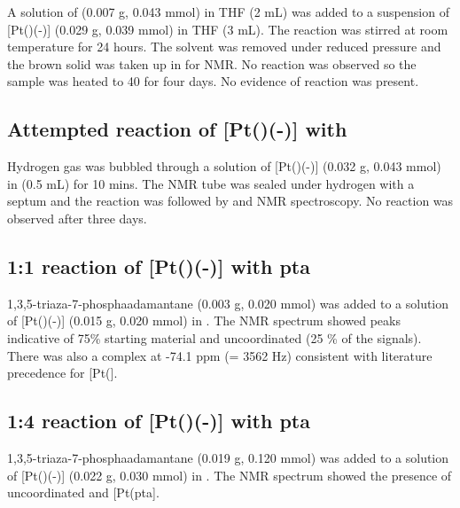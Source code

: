 A solution of  (0.007 g, 0.043 mmol) in THF (2 mL) was added to a suspension of  [Pt(\tButhixantphos)(-)] (0.029 g, 0.039 mmol) in THF (3 mL).  The reaction was stirred at room temperature for 24 hours.  The solvent was removed under reduced pressure and the brown solid was taken up in  for NMR.  No reaction was observed so the sample was heated to 40 \degC{} for four days.  No evidence of reaction was present.  

\subsection*{Attempted reaction of \texorpdfstring{[Pt(\tButhixantphos)(-)]} P with \texorpdfstring{} H}

Hydrogen gas was bubbled through a solution of [Pt(\tButhixantphos)(-)] (0.032 g, 0.043 mmol) in  (0.5 mL) for 10 mins.  The NMR tube was sealed under hydrogen with a septum and the reaction was followed by \proton{} and \phosphorus{} NMR spectroscopy.  No reaction was observed after three days.  

\subsection*{1:1 reaction of \texorpdfstring{[Pt(\tButhixantphos)(-)]} P with pta}

1,3,5-triaza-7-phosphaadamantane (0.003 g, 0.020 mmol) was added to a solution of [Pt(\tButhixantphos)(-)] (0.015 g, 0.020 mmol) in .  The \phosphorus{} NMR spectrum showed peaks indicative of 75\% starting material and uncoordinated \tButhixantphos{} (25 \% of the \tButhixantphos{} signals).  There was also a complex at -74.1 ppm (\JPtP = 3562 Hz) consistent with literature precedence for [Pt(].\cite{Darensbourg1997}

\subsection*{1:4 reaction of \texorpdfstring{[Pt(\tButhixantphos)(-)]} P with pta}

1,3,5-triaza-7-phosphaadamantane (0.019 g, 0.120 mmol) was added to a solution of [Pt(\tButhixantphos)(-)] (0.022 g, 0.030 mmol) in .  The \phosphorus{} NMR spectrum showed the presence of uncoordinated \tButhixantphos{} and [Pt(pta].  

